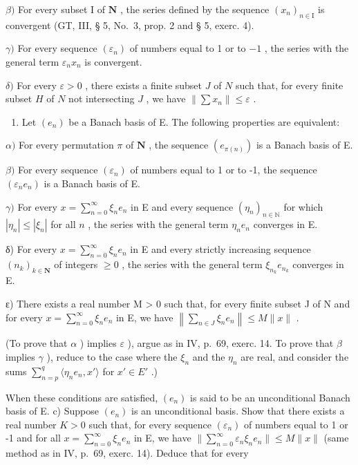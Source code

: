 \(\beta)\) For every subset I of \(\mathbf{N}\) , the series defined by the sequence \((x_{n})_{n\in \mathrm{I}}\) is convergent (GT, III, § 5, No.~3, prop. 2 and § 5, exerc. 4).

\(\gamma)\) For every sequence \((\varepsilon_{n})\) of numbers equal to 1 or to \(-1\) , the series with the general term \(\varepsilon_{n}x_{n}\) is convergent.

\(\delta)\) For every \(\varepsilon > 0\) , there exists a finite subset \(J\) of \(N\) such that, for every finite subset \(H\) of \(N\) not intersecting \(J\) , we have \(\| \sum x_n \| \leqslant \varepsilon\) .

\begin{enumerate}
\def\labelenumi{\alph{enumi})}
\setcounter{enumi}{1}
\tightlist
\item
  Let \((e_n)\) be a Banach basis of E. The following properties are equivalent:
\end{enumerate}

\(\alpha)\) For every permutation \(\pi\) of \(\mathbf{N}\) , the sequence \((e_{\pi(n)})\) is a Banach basis of E.

\(\beta)\) For every sequence \((\varepsilon_{n})\) of numbers equal to 1 or to -1, the sequence \((\varepsilon_{n}e_{n})\) is a Banach basis of E.

\(\gamma)\) For every \(x = \sum_{n=0}^{\infty} \xi_n e_n\) in E and every sequence \((\eta_n)_{n \in \mathbb{N}}\) for which \(|\eta_n| \leqslant |\xi_n|\) for all \(n\) , the series with the general term \(\eta_n e_n\) converges in E.

δ) For every \(x = \sum_{n=0}^{\infty} \xi_n e_n\) in E and every strictly increasing sequence \((n_k)_{k \in \mathbf{N}}\) of integers \(\geqslant 0\) , the series with the general term \(\xi_{n_k} e_{n_k}\) converges in E.

ε) There exists a real number M \textgreater{} 0 such that, for every finite subset J of N and for every \(x = \sum_{n=0}^{\infty} \xi_{n} e_{n}\) in E, we have \(\left\|\sum_{n \in J} \xi_{n} e_{n}\right\| \leqslant M \|x\|\) .

(To prove that \(\alpha\) ) implies \(\varepsilon\) ), argue as in IV, p.~69, exerc. 14. To prove that \(\beta\) implies \(\gamma\) ), reduce to the case where the \(\xi_{n}\) and the \(\eta_{n}\) are real, and consider the sums \(\sum_{n=p}^{q} \langle \eta_{n} e_{n}, x' \rangle\) for \(x' \in E'\) .)

When these conditions are satisfied, \((e_n)\) is said to be an unconditional Banach basis of E. c) Suppose \((e_n)\) is an unconditional basis. Show that there exists a real number \(K > 0\) such that, for every sequence \((\varepsilon_n)\) of numbers equal to 1 or -1 and for all \(x = \sum_{n=0}^{\infty} \xi_n e_n\) in E, we have \(\| \sum_{n=0}^{\infty} \varepsilon_n \xi_n e_n \| \leqslant M \| x\|\) (same method as in IV, p.~69, exerc. 14). Deduce that for every

